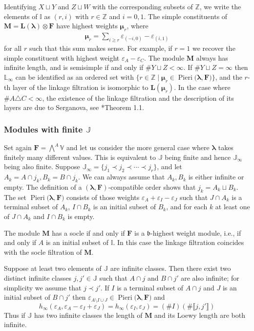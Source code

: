 \documentclass[11pt,fleqn]{amsart}
\newcommand\ZZ{\mathbb Z}
\newcommand\II{\mathbb I}
\newcommand\JJ{\mathbb J}
\newcommand\LL{\mathbb L}
\renewcommand\epsilon{\varepsilon}
\theoremstyle{definition}
\theoremstyle{remark}
\theoremstyle{remark}
\newcommand\VV{\mathbb V}
\newcommand\interval[1]{\llbracket{#1}\rrbracket}
\newcommand\lie[1]{\mathfrak{#1}}
\newcommand\wt[1]{\boldsymbol{#1}}
\newcommand\Pieri[2]{\operatorname{Pieri}{(#1},{#2)}}
\begin{document}
Identifying $X \sqcup Y$ and $Z \sqcup W$ with the corresponding subsets of 
$\ZZ$, we write the elements of $\II$ as $(r,i)$ with $r \in \ZZ$ and $i =0,1$. 
The simple constituents of $\mathbf M = \mathbf L(\wt\lambda) \otimes \mathbf 
F$ have highest weights $\wt\mu_r$, where
\begin{align*}
  \wt\mu_r = \sum_{i \geq r} \epsilon_{(-i,0)} -  \epsilon_{(i,1)}
\end{align*}
for all $r$ such that this sum makes sense. For example, if $r = 1$ we recover
the simple constituent with highest weight $\epsilon_A - \epsilon_C$. The module 
$\mathbf M$ always has infinite length, and is semisimple if and only if $\# Y 
\sqcup Z < \infty$. If $\# Y \sqcup Z = \infty$ then $\LL_\infty$ can be 
identified as an ordered set with $\{r \in \ZZ \mid \wt\mu_r \in 
\Pieri{\wt\lambda}{\mathbf F}\}$, and the $r$-th layer of the linkage 
filtration is isomorphic to $\mathbf L(\wt\mu_r)$. In the case 
where $\# A \triangle C < \infty$, the existence of the linkage filtration and 
the description of its layers are due to Serganova, see 
\cite{Serganova21}*{Theorem 1.1}.

\subsubsection{Modules with finite $\JJ$}
\label{ex:modules_with_finite_jj_}
Set again $\mathbf F = \bigwedge^A \VV$ and let us consider the more general 
case where $\wt\lambda$ takes finitely many different values. This is 
equivalent to $\JJ$ being finite and hence $\JJ_\infty$ being also finite. 
Suppose $\JJ_{\infty} = \{j_1 \prec j_2  \prec \cdots \prec j_r\}$, and let 
$A_k = A \cap j_k, B_k = B \cap j_k$. We can always assume that $A_k, B_k$ is 
either infinite or empty. The definition of a $(\wt\lambda, 
\mathbf F)$-compatible order shows that $j_k = A_k \sqcup B_k$. The set 
$\Pieri{\wt\lambda}{\mathbf F}$ consists of those weights $\epsilon_A + 
\epsilon_I - \epsilon_J$ such that $J \cap A_k$ is a terminal subset of $A_k$, 
$I \cap B_k$ is an initial subset of $B_k$, and for each $k$ at least one of $J 
\cap A_k$ and $I \cap B_k$ is empty. 

The module $\mathbf M$ has a socle if and only if $\mathbf F$ is a $\lie 
b$-highest weight module, i.e., if and only if $A$ is an initial subset of 
$\II$. In this case the linkage filtration coincides with the socle filtration 
of $\mathbf M$. 

Suppose at least two elements of $\JJ$ are infinite classes. Then there exist 
two distinct infinite classes $j,j' \in \JJ$ such that $A \cap j$ and $B \cap 
j'$ are also infinite; for simplicity we assume that $j \prec j'$. If $I$ is a 
terminal subset of $A \cap j$ and $J$ is an initial subset of $B \cap j'$ then 
$\epsilon_{A \setminus I \cup J} \in \Pieri{\wt\lambda}{\mathbf F}$ and
\[
  h_\infty(\epsilon_A, \epsilon_A - \epsilon_I + \epsilon_J)
    = h_\infty(\epsilon_I,\epsilon_J)
    = (\# I) (\# \interval{j,j'})
\] 
Thus if $\JJ$ has two infinite classes the length of $\mathbf M$ and its Loewy
length are both infinite. 
\end{document}
